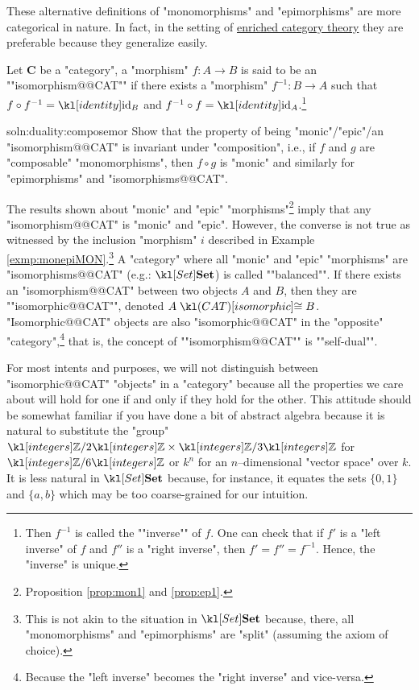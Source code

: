 \documentclass[main.tex]{subfiles}
\begin{document}
\begin{rem}
	These alternative definitions of "monomorphisms" and "epimorphisms" are more categorical in nature. In fact, in the setting of \href{https://ncatlab.org/nlab/show/enriched+category+theory}{enriched category theory} they are preferable because they generalize easily.
\end{rem}
\begin{defn}[Isomorphism]\label{defn:isomorphism}
	\AP Let $\mathbf{C}$ be a "category", a "morphism" $f:A\rightarrow B$ is said to be an ""isomorphism@@CAT"" if there exists a "morphism" $f^{-1}: B\rightarrow A$ such that $f\circ f^{-1} = \id_B$ and $f^{-1}\circ f = \id_A$.\footnote{\AP Then $f^{-1}$ is called the ""inverse"" of $f$. One can check that if $f'$ is a "left inverse" of $f$ and $f''$ is a "right inverse", then $f' = f'' = f^{-1}$. Hence, the "inverse" is unique.}
\end{defn}
\begin{exer}{soln:duality:composemor}\label{exer:duality:composemor}
	Show that the property of being "monic"/"epic"/an "isomorphism@@CAT" is invariant under "composition", i.e., if $f$ and $g$ are "composable" "monomorphisms", then $f \circ g$ is "monic" and similarly for "epimorphisms" and "isomorphisms@@CAT".
\end{exer}
\begin{rem}
	The results shown about "monic" and "epic" "morphisms"\footnote{Proposition \ref{prop:mon1} and \ref{prop:ep1}.} imply that any "isomorphism@@CAT" is "monic" and "epic". However, the converse is not true as witnessed by the inclusion "morphism" $i$ described in Example \ref{exmp:monepiMON}.\footnote{This is not akin to the situation in $\catSet$ because, there, all "monomorphisms" and "epimorphisms" are "split" (assuming the axiom of choice).} \AP A "category" where all "monic" and "epic" "morphisms" are "isomorphisms@@CAT" (e.g.: $\catSet$) is called ""balanced"". \AP If there exists an "isomorphism@@CAT" between two objects $A$ and $B$, then they are ""isomorphic@@CAT"", denoted $A \isoCAT B$. \AP "Isomorphic@@CAT" objects are also "isomorphic@@CAT" in the "opposite" "category",\footnote{Because the "left inverse" becomes the "right inverse" and vice-versa.} that is, the concept of ""isomorphism@@CAT"" is ""self-dual"".
	
	For most intents and purposes, we will not distinguish between "isomorphic@@CAT" "objects" in a "category" because all the properties we care about will hold for one if and only if they hold for the other. This attitude should be somewhat familiar if you have done a bit of abstract algebra because it is natural to substitute the "group" $\Z/2\Z \times \Z/3\Z$ for $\Z/6\Z$ or $k^n$ for an $n$--dimensional "vector space" over $k$. It is less natural in $\catSet$ because, for instance, it equates the sets $\{0,1\}$ and $\{a,b\}$ which may be too coarse-grained for our intuition.
\end{rem} %
\end{document}
